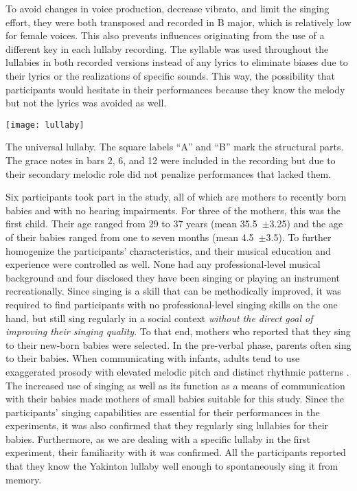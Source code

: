 To avoid changes in voice production, decrease vibrato, and limit the singing effort, they were both transposed and recorded in B major, which is relatively low for female voices.
This also prevents influences originating from the use of a different key in each lullaby recording.
The syllable \textipa{[na]} was used throughout the lullabies in both recorded versions instead of any lyrics to eliminate biases due to their lyrics or the realizations of specific sounds.
This way, the possibility that participants would hesitate in their performances because they know the melody but not the lyrics was avoided as well.
%
\begin{snippet}[t]
	\centering
	\texttt{[image: lullaby]}
	\caption[Universal lullaby]
		{The universal lullaby.
		The square labels \enquote{A} and \enquote{B} mark the structural parts.
		The grace notes in bars 2, 6, and 12 were included in the recording but due to their secondary melodic role did not penalize performances that lacked them.}
	\label{snippet:uni-lullaby}
\end{snippet}
%

Six participants took part in the study, all of which are mothers to recently born babies and with no hearing impairments.
For three of the mothers, this was the first child.
Their age ranged from 29 to 37 years (mean 35.5~$\pm$3.25) and the age of their babies ranged from one to seven months (mean 4.5~$\pm$3.5).
To further homogenize the participants' characteristics, and their musical education and experience were controlled as well.
None had any professional-level musical background and four disclosed they have been singing or playing an instrument recreationally.
Since singing is a skill that can be methodically improved, it was required to find participants with no professional-level singing skills on the one hand, but still sing regularly in a social context \emph{without the direct goal of improving their singing quality}.
To that end, mothers who reported that they sing to their new-born babies were selected.
In the pre-verbal phase, parents often sing to their babies.
When communicating with infants, adults tend to use exaggerated prosody with elevated melodic pitch and distinct rhythmic patterns \citep{Fernald1991prosody}.
The increased use of singing as well as its function as a means of communication with their babies \citep[see][]{Street2003mothers,Papouvsek1991meanings} made mothers of small babies suitable for this study.
Since the participants' singing capabilities are essential for their performances in the experiments, it was also confirmed that they regularly sing lullabies for their babies.
Furthermore, as we are dealing with a specific lullaby in the first experiment, their familiarity with it was confirmed.
All the participants reported that they know the Yakinton lullaby well enough to spontaneously sing it from memory.


